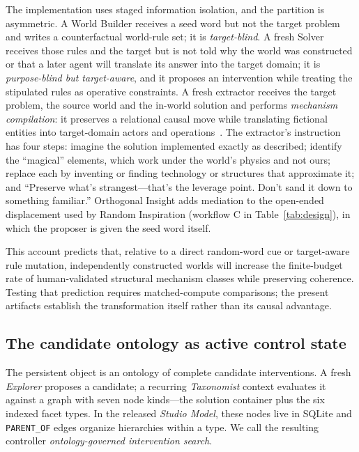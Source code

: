\documentclass[11pt,a4paper]{article}
\begin{document}
The implementation uses staged information isolation, and the partition is asymmetric. A World Builder receives a seed word but not the target problem and writes a counterfactual world-rule set; it is \emph{target-blind}. A fresh Solver receives those rules and the target but is not told why the world was constructed or that a later agent will translate its answer into the target domain; it is \emph{purpose-blind but target-aware}, and it proposes an intervention while treating the stipulated rules as operative constraints. A fresh extractor receives the target problem, the source world and the in-world solution and performs \emph{mechanism compilation}: it preserves a relational causal move while translating fictional entities into target-domain actors and operations~\cite{westerberg2025strangeworlds}. The extractor's instruction has four steps: imagine the solution implemented exactly as described; identify the ``magical'' elements, which work under the world's physics and not ours; replace each by inventing or finding technology or structures that approximate it; and ``Preserve what's strangest---that's the leverage point. Don't sand it down to something familiar.'' Orthogonal Insight adds mediation to the open-ended displacement used by Random Inspiration (workflow C in Table~\ref{tab:design}), in which the proposer is given the seed word itself.

This account predicts that, relative to a direct random-word cue or target-aware rule mutation, independently constructed worlds will increase the finite-budget rate of human-validated structural mechanism classes while preserving coherence. Testing that prediction requires matched-compute comparisons; the present artifacts establish the transformation itself rather than its causal advantage.

\subsection{The candidate ontology as active control state}
\label{sec:candidate-ontology}

The persistent object is an ontology of complete candidate interventions. A fresh \emph{Explorer} proposes a candidate; a recurring \emph{Taxonomist} context evaluates it against a graph with seven node kinds---the solution container plus the six indexed facet types. In the released \emph{Studio Model}, these nodes live in SQLite and \texttt{PARENT\_OF} edges organize hierarchies within a type. We call the resulting controller \emph{ontology-governed intervention search}.
\end{document}

